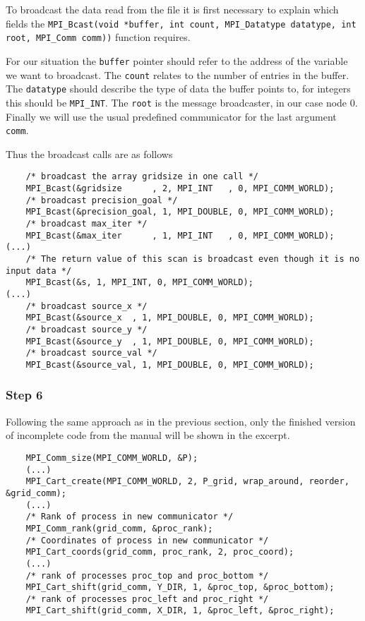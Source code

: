 To broadcast the data read from the file it is first necessary to explain which fields the \texttt{MPI\_Bcast(void *buffer, int count, MPI\_Datatype datatype, int root, MPI\_Comm comm))} function requires. 

For our situation the \texttt{buffer} pointer should refer to the address of the variable we want to broadcast. The \texttt{count} relates to the number of entries in the buffer. The \texttt{datatype} should describe the type of data the buffer points to, \eg for integers this should be \texttt{MPI\_INT}. The \texttt{root} is the message broadcaster, in our case node 0. Finally we will use the usual predefined communicator for the last argument \texttt{comm}.

Thus the broadcast calls are as follows
\begin{lstlisting}
    /* broadcast the array gridsize in one call */
    MPI_Bcast(&gridsize      , 2, MPI_INT   , 0, MPI_COMM_WORLD);
    /* broadcast precision_goal */
    MPI_Bcast(&precision_goal, 1, MPI_DOUBLE, 0, MPI_COMM_WORLD);
    /* broadcast max_iter */  
    MPI_Bcast(&max_iter      , 1, MPI_INT   , 0, MPI_COMM_WORLD);
(...)
    /* The return value of this scan is broadcast even though it is no input data */
    MPI_Bcast(&s, 1, MPI_INT, 0, MPI_COMM_WORLD);
(...)
    /* broadcast source_x */
    MPI_Bcast(&source_x  , 1, MPI_DOUBLE, 0, MPI_COMM_WORLD);
    /* broadcast source_y */
    MPI_Bcast(&source_y  , 1, MPI_DOUBLE, 0, MPI_COMM_WORLD);
    /* broadcast source_val */
    MPI_Bcast(&source_val, 1, MPI_DOUBLE, 0, MPI_COMM_WORLD);
\end{lstlisting}

\subsubsection{Step 6}

Following the same approach as in the previous section, only the finished version of incomplete code from the manual will be shown in the excerpt.
\begin{lstlisting}
    MPI_Comm_size(MPI_COMM_WORLD, &P);
    (...)
    MPI_Cart_create(MPI_COMM_WORLD, 2, P_grid, wrap_around, reorder, &grid_comm);
    (...)
    /* Rank of process in new communicator */
    MPI_Comm_rank(grid_comm, &proc_rank);
    /* Coordinates of process in new communicator */
    MPI_Cart_coords(grid_comm, proc_rank, 2, proc_coord);
    (...)
    /* rank of processes proc_top and proc_bottom */
    MPI_Cart_shift(grid_comm, Y_DIR, 1, &proc_top, &proc_bottom);
    /* rank of processes proc_left and proc_right */
    MPI_Cart_shift(grid_comm, X_DIR, 1, &proc_left, &proc_right);
\end{lstlisting}

